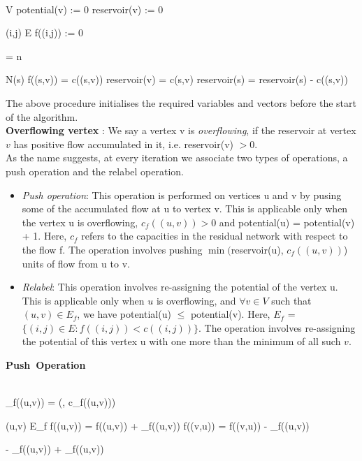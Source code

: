 \documentclass[BTech]{iitmdiss}
\begin{document}
	      
	      \begin{program}
	            
	      \BEGIN \\ %
		\FOR {} \in V \DO
		  potential(v) := 0
		  reservoir(v) := 0
		\OD
		
		\FOR {} (i,j) \in E \DO
		  f((i,j)) := 0
		\OD
		
		 = n
		
		\FOR {} \in N(s) \DO
		  f((s,v)) = c((s,v))
		  reservoir(v) = c(s,v)
		  reservoir(s) = reservoir(s) - c((s,v))
		\OD
		
	      \END
	    \end{program}
	      The above procedure initialises the required variables and vectors before the start of the algorithm. \\
	      
	    \textbf{Overflowing vertex} : We say a vertex v is \textit{overflowing}, if the reservoir at vertex $v$ has positive flow accumulated in it,
	    i.e. reservoir(v) $>0$. \\
	    
	    As the name suggests, at every iteration we associate two types of operations, a push operation and the relabel operation.
	    \begin{itemize}
	     \item 
	      \textit{Push operation}: This operation is performed on vertices u and v by pusing some of the accumulated flow at u to vertex v.
	      This is applicable only when the vertex u is overflowing, $c_f((u,v))>0$ and potential(u) = potential(v) + 1. Here, $c_f$ refers to the 
	      capacities in the residual network with respect to the flow f. The operation involves pushing $\min($reservoir(u), $c_f((u,v))$) units of flow
	      from u to v.
	     \item
	      \textit{Relabel}: This operation involves re-assigning the potential of the vertex u. This is applicable only when $u$ is overflowing, and
	      $\forall v \in V$ such that $(u,v) \in E_f$, we have potential(u) $\leq$ potential(v). Here, $E_f$ = $\{(i,j) \in E : f((i,j)) < c((i,j))\}$.
	      The operation involves re-assigning the potential of this vertex u with one more than the minimum of all such $v$.
	    \end{itemize}
	    
	    \begin{program}
	      \mbox{\textbf{Push Operation}}
	      
	      \PROC{PUSH(u, v):}
	      \BEGIN \\ %
		\Delta_f((u,v)) = \min(, c_f((u,v)))
		
		\IF (u,v) \in E_f
		  \THEN
		    f((u,v)) = f((u,v)) + \Delta_f((u,v))
		  \ELSE
		    f((v,u)) = f((v,u)) - \Delta_f((u,v))
		\FI
		
		 - \Delta_f((u,v))
		 + \Delta_f((u,v))
	      \END
	    \end{program}
	    
\end{document}
